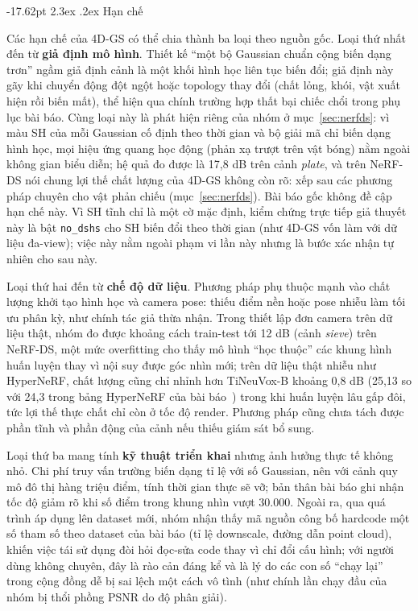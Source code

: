 \documentclass[a4paper]{report}
\makeatletter
\renewcommand\section{\@startsection{section}{1}{\z@}%
    {-17.62pt \@plus -5.89pt \@minus -1.18pt}%
    {2.3ex \@plus .2ex}%
    {\normalfont\fontsize{14.95pt}{16.31pt}\selectfont\bfseries}}
\makeatother
\begin{document}
\section{Hạn chế}

Các hạn chế của 4D-GS có thể chia thành ba loại theo nguồn gốc. Loại thứ nhất
đến từ \textbf{giả định mô hình}. Thiết kế ``một bộ Gaussian chuẩn cộng biến
dạng trơn'' ngầm giả định cảnh là một khối hình học liên tục biến đổi; giả định
này gãy khi chuyển động đột ngột hoặc topology thay đổi (chất lỏng, khói, vật
xuất hiện rồi biến mất), thể hiện qua chính trường hợp thất bại chiếc chổi trong phụ
lục bài báo. Cùng loại này là phát hiện riêng của nhóm ở mục~\ref{sec:nerfds}:
vì màu SH của mỗi Gaussian cố định theo thời gian và bộ giải mã chỉ biến dạng
hình học, mọi hiệu ứng quang học động (phản xạ trượt trên vật bóng) nằm ngoài
không gian biểu diễn; hệ quả đo được là 17,8 dB trên cảnh \textit{plate}, và trên
NeRF-DS nói chung lợi thế chất lượng của 4D-GS không còn rõ: xếp sau các phương
pháp chuyên cho vật phản chiếu (mục~\ref{sec:nerfds}). Bài báo gốc
không đề cập hạn chế này. Vì SH tĩnh chỉ là một cờ mặc định, kiểm chứng trực tiếp giả
thuyết này là bật \texttt{no\_dshs} cho SH biến đổi theo thời gian (như 4D-GS vốn làm với dữ
liệu đa-view); việc này nằm ngoài phạm vi lần này nhưng là bước xác nhận tự nhiên cho sau này.

Loại thứ hai đến từ \textbf{chế độ dữ liệu}. Phương pháp phụ thuộc mạnh vào
chất lượng khởi tạo hình học và camera pose: thiếu điểm nền hoặc pose nhiễu làm
tối ưu phân kỳ, như chính tác giả thừa nhận. Trong thiết lập đơn camera trên dữ
liệu thật, nhóm đo được khoảng cách train-test tới 12 dB (cảnh \textit{sieve}) trên NeRF-DS, một mức
overfitting cho thấy mô hình ``học thuộc'' các khung hình huấn luyện thay vì
nội suy được góc nhìn mới; trên dữ liệu thật nhiễu như HyperNeRF, chất lượng
cũng chỉ nhỉnh hơn TiNeuVox-B khoảng 0,8 dB (25,13 so với 24,3 trong bảng HyperNeRF của bài báo~\cite{wu20244dgs}) trong khi huấn luyện lâu gấp đôi, tức lợi
thế thực chất chỉ còn ở tốc độ render. Phương pháp cũng chưa tách được phần
tĩnh và phần động của cảnh nếu thiếu giám sát bổ sung.

Loại thứ ba mang tính \textbf{kỹ thuật triển khai} nhưng ảnh hưởng thực tế không
nhỏ. Chi phí truy vấn trường biến dạng tỉ lệ với số Gaussian, nên với cảnh quy
mô đô thị hàng triệu điểm, tính thời gian thực sẽ vỡ; bản thân bài báo ghi nhận
tốc độ giảm rõ khi số điểm trong khung nhìn vượt 30.000. Ngoài ra, qua quá trình
áp dụng lên dataset mới, nhóm nhận thấy mã nguồn công bố hardcode một số tham
số theo dataset của bài báo (tỉ lệ downscale, đường dẫn point cloud), khiến
việc tái sử dụng đòi hỏi đọc-sửa code thay vì chỉ đổi cấu hình; với người dùng
không chuyên, đây là rào cản đáng kể và là lý do các con số ``chạy lại'' trong
cộng đồng dễ bị sai lệch một cách vô tình (như chính lần chạy đầu của nhóm bị
thổi phồng PSNR do độ phân giải).
\end{document}
